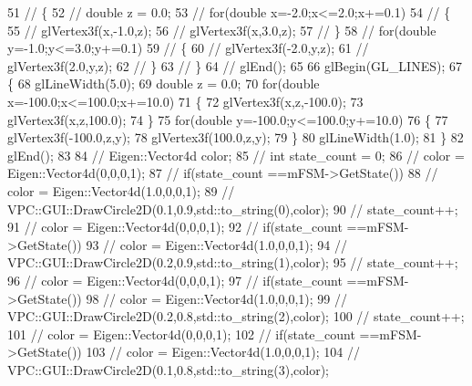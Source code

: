 \begin{DoxyCode}
51     \textcolor{comment}{// \{}
52     \textcolor{comment}{//  double z = 0.0;}
53     \textcolor{comment}{//  for(double x=-2.0;x<=2.0;x+=0.1)}
54     \textcolor{comment}{//  \{}
55     \textcolor{comment}{//      glVertex3f(x,-1.0,z);}
56     \textcolor{comment}{//      glVertex3f(x,3.0,z);}
57     \textcolor{comment}{//  \}}
58     \textcolor{comment}{//  for(double y=-1.0;y<=3.0;y+=0.1)}
59     \textcolor{comment}{//  \{}
60     \textcolor{comment}{//      glVertex3f(-2.0,y,z);}
61     \textcolor{comment}{//      glVertex3f(2.0,y,z);}
62     \textcolor{comment}{//  \}}
63     \textcolor{comment}{// \}}
64     \textcolor{comment}{// glEnd();}
65 
66     glBegin(GL\_LINES);
67     \{
68         glLineWidth(5.0);
69         \textcolor{keywordtype}{double} z = 0.0;
70         \textcolor{keywordflow}{for}(\textcolor{keywordtype}{double} x=-100.0;x<=100.0;x+=10.0)
71         \{
72             glVertex3f(x,z,-100.0);
73             glVertex3f(x,z,100.0);
74         \}
75         \textcolor{keywordflow}{for}(\textcolor{keywordtype}{double} y=-100.0;y<=100.0;y+=10.0)
76         \{
77             glVertex3f(-100.0,z,y);
78             glVertex3f(100.0,z,y);
79         \}
80         glLineWidth(1.0);
81     \}
82     glEnd();
83     
84 \textcolor{comment}{//  Eigen::Vector4d color;}
85 \textcolor{comment}{//  int state\_count = 0;}
86 \textcolor{comment}{//  color = Eigen::Vector4d(0,0,0,1);}
87 \textcolor{comment}{//  if(state\_count ==mFSM->GetState())}
88 \textcolor{comment}{//      color = Eigen::Vector4d(1.0,0,0,1);}
89 \textcolor{comment}{//  VPC::GUI::DrawCircle2D(0.1,0.9,std::to\_string(0),color);}
90 \textcolor{comment}{//  state\_count++;}
91 \textcolor{comment}{//  color = Eigen::Vector4d(0,0,0,1);}
92 \textcolor{comment}{//  if(state\_count ==mFSM->GetState())}
93 \textcolor{comment}{//      color = Eigen::Vector4d(1.0,0,0,1);}
94 \textcolor{comment}{//  VPC::GUI::DrawCircle2D(0.2,0.9,std::to\_string(1),color);}
95 \textcolor{comment}{//  state\_count++;}
96 \textcolor{comment}{//  color = Eigen::Vector4d(0,0,0,1);}
97 \textcolor{comment}{//  if(state\_count ==mFSM->GetState())}
98 \textcolor{comment}{//      color = Eigen::Vector4d(1.0,0,0,1);}
99 \textcolor{comment}{//  VPC::GUI::DrawCircle2D(0.2,0.8,std::to\_string(2),color);}
100 \textcolor{comment}{//  state\_count++;}
101 \textcolor{comment}{//  color = Eigen::Vector4d(0,0,0,1);}
102 \textcolor{comment}{//  if(state\_count ==mFSM->GetState())}
103 \textcolor{comment}{//      color = Eigen::Vector4d(1.0,0,0,1);}
104 \textcolor{comment}{//  VPC::GUI::DrawCircle2D(0.1,0.8,std::to\_string(3),color);}

\end{DoxyCode}
